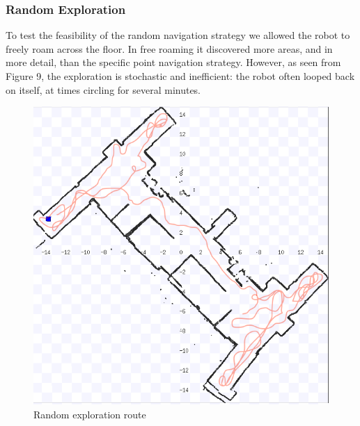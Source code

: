 \documentclass{article}
\begin{document}
	\begin{minipage}{\linewidth}
      \centering
      \begin{minipage}[b]{0.45\linewidth}
      \subsubsection{Random Exploration}
   To test the feasibility of the random navigation strategy we allowed the robot to freely roam across the floor. In free roaming it discovered more areas, and in more detail, than the specific point navigation strategy. However, as seen from Figure 9, the exploration is stochastic and inefficient: the robot often looped back on itself, at times circling for several minutes.
      \end{minipage}
      \hspace{0.05\linewidth}
      \begin{minipage}{0.45\linewidth}
          \begin{figure}[H]
              \includegraphics[width=\linewidth]{ExperimentalResults9}
              \caption{Random exploration route}
          \end{figure}
      \end{minipage}
  \end{minipage}
  
\end{document}
